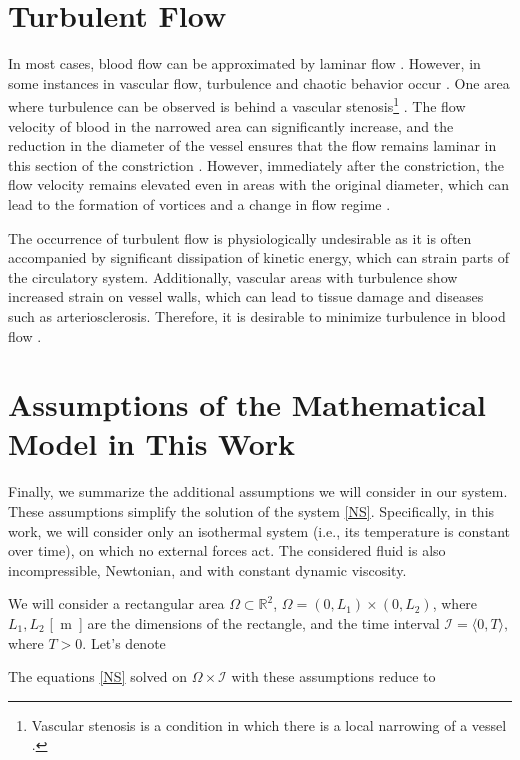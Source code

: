 \section*{\fontsize{11}{15}\selectfont Turbulent Flow}
In most cases, blood flow can be approximated by laminar flow \cite{Sequeira}. However, in some instances in vascular flow, turbulence and chaotic behavior occur \cite{Saqr2020}. One area where turbulence can be observed is behind a vascular stenosis\footnote{Vascular stenosis is a condition in which there is a local narrowing of a vessel \cite{Carabello2009}.} \cite{Jain2022}. The flow velocity of blood in the narrowed area can significantly increase, and the reduction in the diameter of the vessel ensures that the flow remains laminar in this section of the constriction \cite{Sequeira}. However, immediately after the constriction, the flow velocity remains elevated even in areas with the original diameter, which can lead to the formation of vortices and a change in flow regime \cite{Saloner2019, Varghese2003}.

The occurrence of turbulent flow is physiologically undesirable as it is often accompanied by significant dissipation of kinetic energy, which can strain parts of the circulatory system. Additionally, vascular areas with turbulence show increased strain on vessel walls, which can lead to tissue damage and diseases such as arteriosclerosis. Therefore, it is desirable to minimize turbulence in blood flow \cite{Saloner2019, Kameneva2004}.

\section{Assumptions of the Mathematical Model in This Work}\label{pred}
Finally, we summarize the additional assumptions we will consider in our system. These assumptions simplify the solution of the system \eqref{NS}. Specifically, in this work, we will consider only an isothermal system (i.e., its temperature is constant over time), on which no external forces act. The considered fluid is also incompressible, Newtonian, and with constant dynamic viscosity.

We will consider a rectangular area $ \Omega \subset \mathbb{R}^2 $, $ \Omega = (0, L_1) \times (0, L_2) $, where $ L_1, L_2 $ \si{[m]} are the dimensions of the rectangle, and the time interval $ \mathcal{I} = \langle 0, T \rangle,$ where $ T > 0$. Let's denote

The equations \eqref{NS} solved on $ \Omega \times \mathcal{I} $ with these assumptions reduce to \cite{Schlichting}

